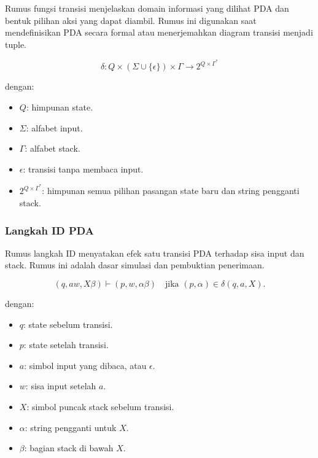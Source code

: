 \begin{jawab}
Rumus fungsi transisi menjelaskan domain informasi yang dilihat PDA dan bentuk pilihan aksi yang dapat diambil. Rumus ini digunakan saat mendefinisikan PDA secara formal atau menerjemahkan diagram transisi menjadi tuple.
\end{jawab}

\begin{equation}
    \delta: Q \times (\Sigma \cup \{\epsilon\}) \times \Gamma \rightarrow 2^{Q \times \Gamma^*}
    \label{eq:fungsi-transisi-pda}
\end{equation}

dengan:
\begin{itemize}
    \item $Q$: himpunan state.
    \item $\Sigma$: alfabet input.
    \item $\Gamma$: alfabet stack.
    \item $\epsilon$: transisi tanpa membaca input.
    \item $2^{Q \times \Gamma^*}$: himpunan semua pilihan pasangan state baru dan string pengganti stack.
\end{itemize}

\subsubsection{Langkah ID PDA}

\begin{jawab}
Rumus langkah ID menyatakan efek satu transisi PDA terhadap sisa input dan stack. Rumus ini adalah dasar simulasi dan pembuktian penerimaan.
\end{jawab}

\begin{equation}
    (q,aw,X\beta)\vdash(p,w,\alpha\beta)
    \quad \text{jika } (p,\alpha)\in\delta(q,a,X).
    \label{eq:langkah-id-pda}
\end{equation}

dengan:
\begin{itemize}
    \item $q$: state sebelum transisi.
    \item $p$: state setelah transisi.
    \item $a$: simbol input yang dibaca, atau $\epsilon$.
    \item $w$: sisa input setelah $a$.
    \item $X$: simbol puncak stack sebelum transisi.
    \item $\alpha$: string pengganti untuk $X$.
    \item $\beta$: bagian stack di bawah $X$.
\end{itemize}

